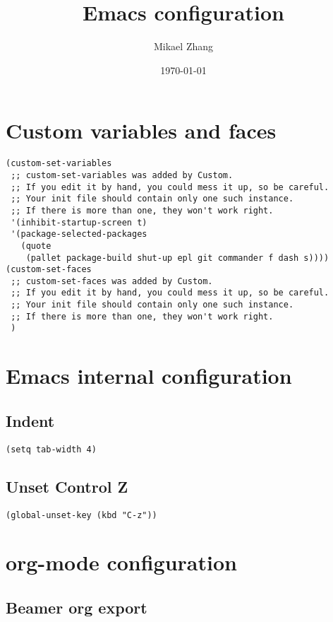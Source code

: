 \documentclass[11pt]{article}
\author{Mikael Zhang}
\date{\today}
\title{Emacs configuration}
\begin{document}
\maketitle
\tableofcontents


\section{Custom variables and faces}
\label{sec-1}

\begin{verbatim}
(custom-set-variables
 ;; custom-set-variables was added by Custom.
 ;; If you edit it by hand, you could mess it up, so be careful.
 ;; Your init file should contain only one such instance.
 ;; If there is more than one, they won't work right.
 '(inhibit-startup-screen t)
 '(package-selected-packages
   (quote
    (pallet package-build shut-up epl git commander f dash s))))
(custom-set-faces
 ;; custom-set-faces was added by Custom.
 ;; If you edit it by hand, you could mess it up, so be careful.
 ;; Your init file should contain only one such instance.
 ;; If there is more than one, they won't work right.
 )
\end{verbatim}

\section{Emacs internal configuration}
\label{sec-2}
\subsection{Indent}
\label{sec-2-1}
\begin{verbatim}
(setq tab-width 4)
\end{verbatim}
\subsection{Unset Control Z}
\label{sec-2-2}
\begin{verbatim}
(global-unset-key (kbd "C-z"))
\end{verbatim}

\section{org-mode configuration}
\label{sec-3}
\subsection{Beamer org export}
\label{sec-3-1}
\end{document}
